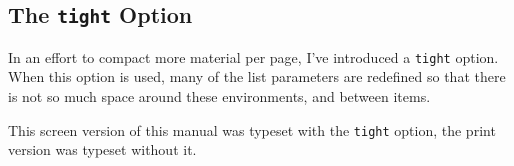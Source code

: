 \documentclass{article}
\begin{document}
%
%
%
%
%


\subsection{The \texttt{tight} Option}\label{sss:webtight}

In an effort to compact more material per page, I've introduced a
\texttt{tight} option.  When this option is used, many of the list
parameters are redefined so that there is not so much space around these
environments, and between items.
\begin{sverbatim}
   \usepackage[<driver_option>,tight,<other_options>]{web}
\end{sverbatim}
\noindent This screen version of this manual was typeset with the
\texttt{tight} option, the print version was typeset without it.
\end{document}
